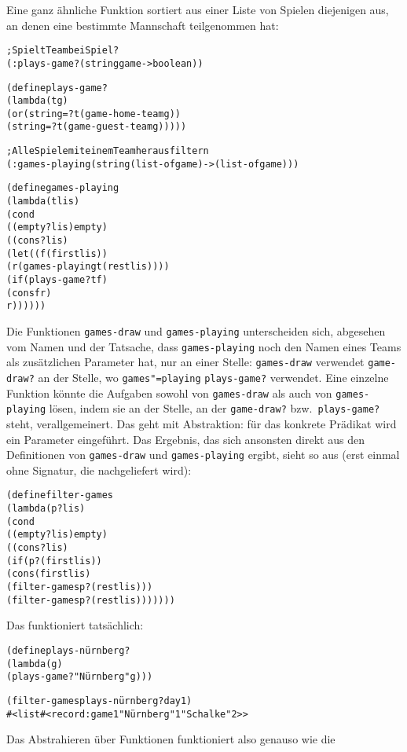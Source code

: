 Eine ganz ähnliche Funktion sortiert aus einer Liste von Spielen diejenigen
aus, an denen eine bestimmte Mannschaft teilgenommen hat:
%
\begin{alltt}
; Spielt Team bei Spiel?
(: plays-game? (string game -> boolean))

(define plays-game?
  (lambda (t g)
    (or (string=? t (game-home-team g))
        (string=? t (game-guest-team g)))))

; Alle Spiele mit einem Team herausfiltern
(: games-playing (string (list-of game) -> (list-of game)))

(define games-playing
  (lambda (t lis)
    (cond
      ((empty? lis) empty)
      ((cons? lis)
       (let ((f (first lis))
             (r (games-playing t (rest lis))))
         (if (plays-game? t f)
             (cons f r)
             r))))))
\end{alltt}
%
Die Funktionen \texttt{games-draw} und \texttt{games-playing} unterscheiden
sich, abgesehen vom Namen und der Tatsache, dass \texttt{games-playing} noch
den Namen eines Teams als zusätzlichen Parameter hat, nur an
einer Stelle: \texttt{games-draw} verwendet
\texttt{game-draw?} an der Stelle, wo \texttt{games"=playing} 
\texttt{plays-game?} verwendet.  Eine einzelne Funktion könnte die
Aufgaben sowohl von \texttt{games-draw} als auch von \texttt{games-playing}
lösen, indem sie an der Stelle, an der \texttt{game-draw?}
bzw.\ \texttt{plays-game?} steht, verallgemeinert.  Das geht mit
Abstraktion: für das konkrete Prädikat wird ein
Parameter eingeführt.  Das Ergebnis, das sich ansonsten
direkt aus den Definitionen von \texttt{games-draw} und
\texttt{games-playing} ergibt, sieht so aus (erst einmal ohne
Signatur, die nachgeliefert wird):
%
\begin{alltt}
(define filter-games
  (lambda (p? lis)
    (cond
      ((empty? lis) empty)
      ((cons? lis)
       (if (p? (first lis))
           (cons (first lis)
                      (filter-games p? (rest lis)))
           (filter-games p? (rest lis)))))))
\end{alltt}
%
Das funktioniert tatsächlich:
%
\begin{alltt}
(define plays-nürnberg?
   (lambda (g)
      (plays-game? "Nürnberg" g)))

(filter-games plays-nürnberg? day1)
\evalsto{} #<list #<record:game 1 "Nürnberg" 1 "Schalke" 2>>
\end{alltt}
%
Das Abstrahieren über Funktionen funktioniert also genauso wie die
